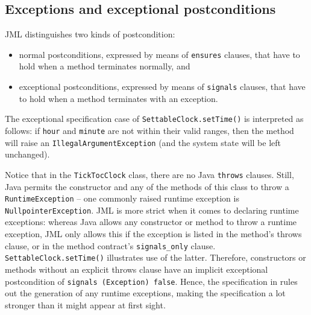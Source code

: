 \documentclass{llncs}
\begin{document}

\subsection{Exceptions and exceptional postconditions}
\label{Sec:Exceptions}

JML distinguishes two kinds of postcondition: 
\begin{itemize}
  \item normal postconditions, expressed
    by means of \texttt{ensures} clauses, that have to hold when a method
    terminates normally, and
    \item exceptional postconditions, expressed by means of \texttt{signals}
      clauses, that have to hold when a method terminates with an exception.
\end{itemize}
%
The exceptional specification case of \texttt{SettableClock.setTime()} is
interpreted as follows: if \texttt{hour} and \texttt{minute} are not within
their valid ranges, then the method will raise an \texttt{IllegalArgumentException} 
(and the system state will be left unchanged).

Notice that in the \texttt{TickTocClock} class,
there are no Java \texttt{throws} clauses.
Still, Java permits the constructor and any of the methods of this class to throw a 
\texttt{Runtime\-Exception} -- one commonly raised runtime exception is 
\texttt{Null\-pointer\-Exception}.
%
JML is more strict when it comes to declaring runtime exceptions: 
whereas Java allows any constructor or method to throw a runtime exception, JML only 
allows this if the exception is listed in the method's throws clause,
or in the method contract's \texttt{signals\_only} clause.
\texttt{SettableClock.setTime()} illustrates use of the latter.
%
Therefore, constructors or methods without an explicit throws clause
have an implicit exceptional postcondition of \texttt{signals (Exception) false}.
%
Hence, the specification in  
rules out the generation of any runtime exceptions, making the specification a lot stronger 
than it might appear at first sight.
\end{document}

